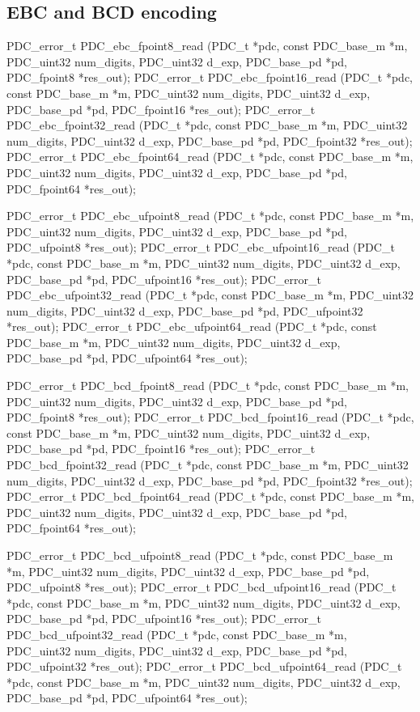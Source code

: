 \subsection{EBC and BCD encoding}

\cBegin{}
\cEnd{}

\begin{tinycodeaux}{\leftmargin=0in}
\codeallowbreaks
PDC_error_t PDC_ebc_fpoint8_read   (PDC_t *pdc, const PDC_base_m *m, PDC_uint32 num_digits, PDC_uint32 d_exp,
				    PDC_base_pd *pd, PDC_fpoint8 *res_out);
PDC_error_t PDC_ebc_fpoint16_read  (PDC_t *pdc, const PDC_base_m *m, PDC_uint32 num_digits, PDC_uint32 d_exp,
				    PDC_base_pd *pd, PDC_fpoint16 *res_out);
PDC_error_t PDC_ebc_fpoint32_read  (PDC_t *pdc, const PDC_base_m *m, PDC_uint32 num_digits, PDC_uint32 d_exp,
				    PDC_base_pd *pd, PDC_fpoint32 *res_out);
PDC_error_t PDC_ebc_fpoint64_read  (PDC_t *pdc, const PDC_base_m *m, PDC_uint32 num_digits, PDC_uint32 d_exp,
				    PDC_base_pd *pd, PDC_fpoint64 *res_out);

PDC_error_t PDC_ebc_ufpoint8_read  (PDC_t *pdc, const PDC_base_m *m, PDC_uint32 num_digits, PDC_uint32 d_exp,
				    PDC_base_pd *pd, PDC_ufpoint8 *res_out);
PDC_error_t PDC_ebc_ufpoint16_read (PDC_t *pdc, const PDC_base_m *m, PDC_uint32 num_digits, PDC_uint32 d_exp,
				    PDC_base_pd *pd, PDC_ufpoint16 *res_out);
PDC_error_t PDC_ebc_ufpoint32_read (PDC_t *pdc, const PDC_base_m *m, PDC_uint32 num_digits, PDC_uint32 d_exp,
				    PDC_base_pd *pd, PDC_ufpoint32 *res_out);
PDC_error_t PDC_ebc_ufpoint64_read (PDC_t *pdc, const PDC_base_m *m, PDC_uint32 num_digits, PDC_uint32 d_exp,
				    PDC_base_pd *pd, PDC_ufpoint64 *res_out);

PDC_error_t PDC_bcd_fpoint8_read   (PDC_t *pdc, const PDC_base_m *m, PDC_uint32 num_digits, PDC_uint32 d_exp,
				    PDC_base_pd *pd, PDC_fpoint8 *res_out);
PDC_error_t PDC_bcd_fpoint16_read  (PDC_t *pdc, const PDC_base_m *m, PDC_uint32 num_digits, PDC_uint32 d_exp,
				    PDC_base_pd *pd, PDC_fpoint16 *res_out);
PDC_error_t PDC_bcd_fpoint32_read  (PDC_t *pdc, const PDC_base_m *m, PDC_uint32 num_digits, PDC_uint32 d_exp,
				    PDC_base_pd *pd, PDC_fpoint32 *res_out);
PDC_error_t PDC_bcd_fpoint64_read  (PDC_t *pdc, const PDC_base_m *m, PDC_uint32 num_digits, PDC_uint32 d_exp,
				    PDC_base_pd *pd, PDC_fpoint64 *res_out);

PDC_error_t PDC_bcd_ufpoint8_read  (PDC_t *pdc, const PDC_base_m *m, PDC_uint32 num_digits, PDC_uint32 d_exp,
				    PDC_base_pd *pd, PDC_ufpoint8 *res_out);
PDC_error_t PDC_bcd_ufpoint16_read (PDC_t *pdc, const PDC_base_m *m, PDC_uint32 num_digits, PDC_uint32 d_exp,
				    PDC_base_pd *pd, PDC_ufpoint16 *res_out);
PDC_error_t PDC_bcd_ufpoint32_read (PDC_t *pdc, const PDC_base_m *m, PDC_uint32 num_digits, PDC_uint32 d_exp,
				    PDC_base_pd *pd, PDC_ufpoint32 *res_out);
PDC_error_t PDC_bcd_ufpoint64_read (PDC_t *pdc, const PDC_base_m *m, PDC_uint32 num_digits, PDC_uint32 d_exp,
				    PDC_base_pd *pd, PDC_ufpoint64 *res_out);

\end{tinycodeaux}
